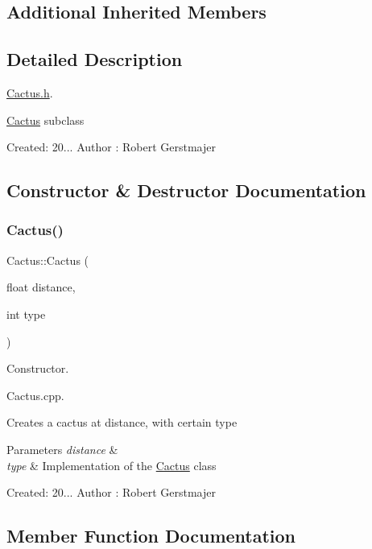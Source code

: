 \subsection*{Additional Inherited Members}


\subsection{Detailed Description}
\mbox{\hyperlink{_cactus_8h_source}{Cactus.\+h}}. 

\mbox{\hyperlink{class_cactus}{Cactus}} subclass

Created\+: 20... Author \+: Robert Gerstmajer 

\subsection{Constructor \& Destructor Documentation}
\mbox{\label{class_cactus_a1db8ad82bbfb944cf480d84b55ebd837}} 
\subsubsection{\texorpdfstring{Cactus()}{Cactus()}}
{\footnotesize\ttfamily Cactus\+::\+Cactus (\begin{DoxyParamCaption}\item[{float}]{distance,  }\item[{int}]{type }\end{DoxyParamCaption})}



Constructor. 

Cactus.\+cpp.

Creates a cactus at distance, with certain type 
\begin{DoxyParams}{Parameters}
{\em distance} & \\
\hline
{\em type} & Implementation of the \mbox{\hyperlink{class_cactus}{Cactus}} class\\
\hline
\end{DoxyParams}
Created\+: 20... Author \+: Robert Gerstmajer 

\subsection{Member Function Documentation}
\mbox{\label{class_cactus_aa432a0a002a0027ca294813d11cb76f3}} 
